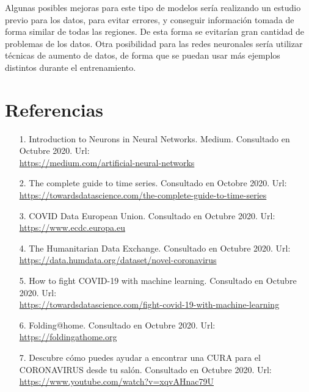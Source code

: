 \documentclass[12pt,a4paper, xcolor=table]{article}
\begin{document}
    \vspace{2mm}

    Algunas posibles mejoras para este tipo de modelos sería realizando un estudio previo para los datos, para evitar errores, y conseguir información tomada de forma similar de todas las regiones. De esta forma se evitarían gran cantidad de problemas de los datos. Otra posibilidad para las redes neuronales sería utilizar técnicas de aumento de datos, de forma que se puedan usar más ejemplos distintos durante el entrenamiento.




\clearpage

\section{Referencias}
    \begin{itemize}
        \item [1.] Introduction to Neurons in Neural Networks. Medium. Consultado en Octubre 2020. Url: \\
        \href{https://medium.com/artificial-neural-networks/introduction-to-neurons-in-neural-networks-71828d040a65}{https://medium.com/artificial-neural-networks}
        \item [2.] The complete guide to time series. Consultado en Octobre 2020. Url: \\
        \href{https://towardsdatascience.com/the-complete-guide-to-time-series-analysis-and-forecasting-70d476bfe775}{https://towardsdatascience.com/the-complete-guide-to-time-series}
        \item [3.] COVID Data European Union. Consultado en Octubre 2020. Url: \\
        \href{https://www.ecdc.europa.eu/en/geographical-distribution-2019-ncov-cases}{https://www.ecdc.europa.eu}
        \item [4.] The Humanitarian Data Exchange. Consultado en Octubre 2020. Url: \\
        \href{https://data.humdata.org/dataset/novel-coronavirus-2019-ncov-cases}{https://data.humdata.org/dataset/novel-coronavirus}
        \item [5.] How to fight COVID-19 with machine learning. Consultado en Octubre 2020. Url: \\
        \href{https://towardsdatascience.com/fight-covid-19-with-machine-learning-1d1106192d84}{https://towardsdatascience.com/fight-covid-19-with-machine-learning}
        \item [6.] Folding@home. Consultado en Octubre 2020. Url: \\
        \href{https://foldingathome.org}{https://foldingathome.org}
        \item [7.] Descubre cómo puedes ayudar a encontrar una CURA para el CORONAVIRUS desde tu salón. Consultado en Octubre 2020. Url: \\
        \href{https://www.youtube.com/watch?v=xqvAHnac79U}{https://www.youtube.com/watch?v=xqvAHnac79U}
    \end{itemize}
\printindex
\end{document}

